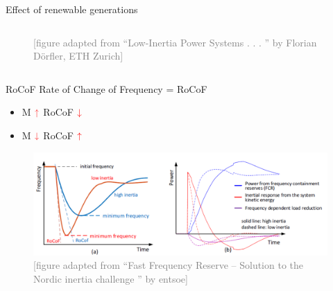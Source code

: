 \documentclass{beamer}
\begin{document}
\begin{frame}{Effect of renewable generations}
\begin{columns}
\begin{figure}
\caption{\textcolor{gray}{\tiny [figure adapted from “Low-Inertia Power Systems . . . ” by Florian Dörfler, ETH Zurich]}}
        \end{figure}
\end{columns}



\end{frame}
\begin{frame}
\begin{block}{RoCoF}
Rate of Change of Frequency = RoCoF\\
\end{block}
\begin{itemize}
\item<1-> M $\textcolor{red}{\uparrow}$ \quad RoCoF $\textcolor{red}{\downarrow}$
\item<2-> M $\textcolor{red}{\downarrow}$ \quad RoCoF $\textcolor{red}{\uparrow}$
\end{itemize}
\begin{figure}
\includegraphics[scale=0.3]{Figures/RoCoF.PNG}
\caption{\textcolor{gray}{\tiny [figure adapted from “Fast Frequency Reserve – Solution to the Nordic inertia challenge ” by entsoe]}}
\end{figure}
\end{frame}

\end{document}
